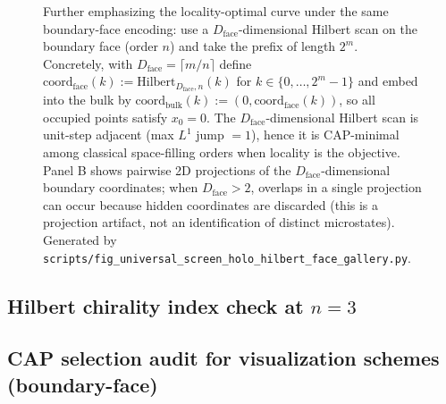 \begin{figure}[H]
\centering
{}
\caption{Further emphasizing the locality-optimal curve under the same boundary-face encoding: use a $D_{\mathrm{face}}$-dimensional Hilbert scan on the boundary face (order $n$) and take the prefix of length $2^m$. Concretely, with $D_{\mathrm{face}}=\lceil m/n\rceil$ define $\mathrm{coord}_{\mathrm{face}}(k):=\mathrm{Hilbert}_{D_{\mathrm{face}},n}(k)$ for $k\in\{0,\dots,2^m-1\}$ and embed into the bulk by $\mathrm{coord}_{\mathrm{bulk}}(k):=(0,\mathrm{coord}_{\mathrm{face}}(k))$, so all occupied points satisfy $x_0=0$. The $D_{\mathrm{face}}$-dimensional Hilbert scan is unit-step adjacent (max $L^1$ jump $=1$), hence it is CAP-minimal among classical space-filling orders when locality is the objective. Panel B shows pairwise 2D projections of the $D_{\mathrm{face}}$-dimensional boundary coordinates; when $D_{\mathrm{face}}>2$, overlaps in a single projection can occur because hidden coordinates are discarded (this is a projection artifact, not an identification of distinct microstates). Generated by \texttt{scripts/fig\_universal\_screen\_holo\_hilbert\_face\_gallery.py}.}
\label{fig:universal_screen_holo_hilbert_face_gallery}
\end{figure}

\subsection{Hilbert chirality index check at \texorpdfstring{$n=3$}{n=3}}



\subsection{CAP selection audit for visualization schemes (boundary-face)}

